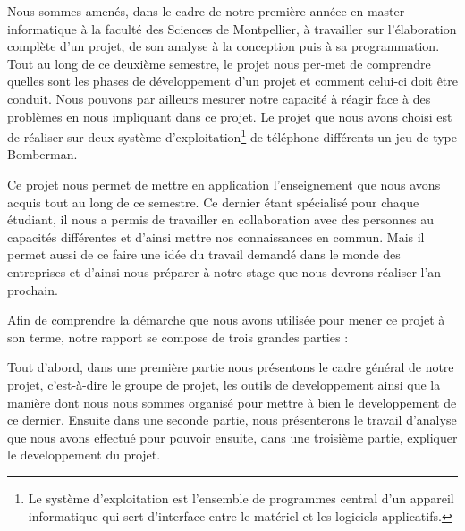 Nous sommes amenés, dans le cadre de notre première annéee en master informatique à la faculté des Sciences de Montpellier, à travailler sur l’élaboration complète d’un projet, de son analyse à la conception puis à sa programmation. Tout au long de ce deuxième semestre, le projet nous per-met de comprendre quelles sont les phases de développement d’un projet et comment celui-ci doit être conduit. Nous pouvons par ailleurs mesurer notre capacité à réagir face à des problèmes en nous impliquant dans ce projet. Le projet que nous avons choisi est de réaliser sur deux système d'exploitation\footnote{Le système d'exploitation est l'ensemble de programmes central d'un appareil informatique qui sert d'interface entre le matériel et les logiciels applicatifs.} de téléphone différents un jeu de type Bomberman.

Ce projet nous permet de mettre en application l'enseignement que nous avons acquis tout au long de ce semestre. Ce dernier étant spécialisé pour chaque étudiant, il nous a permis de travailler en collaboration avec des personnes au capacités différentes et d'ainsi mettre nos connaissances en commun. Mais il permet aussi de ce faire une idée du travail demandé dans le monde des entreprises et d'ainsi nous préparer à notre stage que nous devrons réaliser l'an prochain.

Afin de comprendre la démarche que nous avons utilisée pour mener ce projet à son terme, notre rapport se compose de trois grandes parties : 

Tout d'abord, dans une première partie nous présentons le cadre général de notre projet, c'est-à-dire le groupe de projet, les outils de developpement ainsi que la manière dont nous nous sommes organisé pour mettre à bien le developpement de ce dernier. Ensuite dans une seconde partie, nous présenterons le travail d'analyse que nous avons effectué pour pouvoir ensuite, dans une troisième partie, expliquer le developpement du projet.